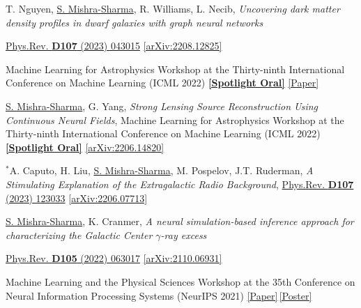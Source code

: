 \documentclass[letterpaper,11pt]{article}
\newenvironment{packed_itemize}{
\begin{itemize}[label=\raisebox{0.25ex}{\tiny$\bullet$}]
  \setlength{\itemsep}{4.2pt}
  \setlength{\parskip}{0pt}
  \setlength{\parsep}{0pt}}{\end{itemize}
}
\newenvironment{packed_enumerate}[1][]{
\begin{etaremune}[#1]
  \setlength{\itemsep}{3.7pt}
  \setlength{\parskip}{0pt}
  \setlength{\parsep}{0pt}}{\end{etaremune}
}
\begin{document}
\begin{packed_enumerate}[start=43]
  \item T. Nguyen, \underline{S. Mishra-Sharma}, R. Williams, L. Necib, \emph{Uncovering dark matter density profiles in dwarf galaxies with graph neural networks}
  \begin{packed_itemize}
      \item {\href{https://journals.aps.org/prd/abstract/10.1103/PhysRevD.107.043015}{Phys.Rev. \textbf{D107} (2023) 043015}} \href{https://arxiv.org/abs/2208.12825}{[arXiv:2208.12825]}
      \item Machine Learning for Astrophysics Workshop at the Thirty-ninth International Conference on Machine Learning (ICML 2022) \href{https://ml4astro.github.io/icml2022/}{\textbf{[Spotlight Oral]}} \href{https://ml4astro.github.io/icml2022/assets/38.pdf}{[Paper]}
    \end{packed_itemize}
    
  \item \underline{S. Mishra-Sharma}, G. Yang, \emph{Strong Lensing Source Reconstruction Using Continuous Neural Fields}, {Machine Learning for Astrophysics Workshop at the Thirty-ninth International Conference on Machine Learning (ICML 2022)} \href{https://ml4astro.github.io/icml2022/}{\textbf{[Spotlight Oral]}} \href{https://arxiv.org/abs/2206.14820}{[arXiv:2206.14820]}
   

  \item $^*$A. Caputo, H. Liu, \underline{S. Mishra-Sharma}, M. Pospelov, J.T. Ruderman, \emph{A Stimulating Explanation of the Extragalactic Radio Background}, \href{https://journals.aps.org/prd/abstract/10.1103/PhysRevD.107.123033}{Phys.Rev. \textbf{D107} (2023) 123033} \href{https://arxiv.org/abs/2206.07713}{[arXiv:2206.07713]}

  \item  \underline{S. Mishra-Sharma}, K. Cranmer, \emph{A neural simulation-based inference approach for characterizing the Galactic Center $\gamma$-ray excess}
    \begin{packed_itemize}
      \item {\href{https://journals.aps.org/prd/abstract/10.1103/PhysRevD.105.063017}{Phys.Rev. \textbf{D105} (2022) 063017} \href{https://arxiv.org/abs/2110.06931}{[arXiv:2110.06931]}}
      \item {Machine Learning and the Physical Sciences Workshop at the 35th Conference on Neural Information Processing Systems (NeurIPS 2021) \href{https://ml4physicalsciences.github.io/2020/files/NeurIPS_ML4PS_2020_20.pdf}{[Paper]}\,\href{https://ml4physicalsciences.github.io/2020/files/NeurIPS_ML4PS_2020_20_poster.pdf}{[Poster]}}
    \end{packed_itemize}


\end{packed_enumerate}
\end{document}
